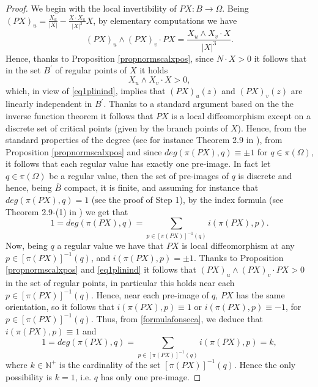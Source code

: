 \documentclass[a4paper,reqno,10pt,oneside]{amsart}
\numberwithin{equation}{section}
\begin{document}
\begin{proof}
We begin with the local invertibility of $PX:B \to \Omega$. Being $(PX)_u= \frac{X_u}{|X|} - \frac{X\cdot X_u}{|X|^3}X$, by elementary computations we have 
\begin{equation}\label{eq1plinind}
(PX)_u\wedge (PX)_v \cdot PX = \frac{X_u \wedge X_v \cdot X}{|X|^3}.
\end{equation}
Hence, thanks to Proposition \ref{propnormscalxpos}, since $N \cdot X >0$ it follows that in the set $B^\prime$ of regular points of $X$ it holds
$$X_u \wedge X_v \cdot X>0, $$
which, in view of \eqref{eq1plinind}, implies that $(PX)_u(z)$ and $(PX)_v(z)$ are linearly independent in $B^\prime$. Thanks to a standard argument based on the the inverse function theorem it follows that $PX$ is a local diffeomorphism except on a discrete set of critical points (given by the branch points of $X$). Hence, from the standard properties of the degree (see for instance Theorem 2.9 in \cite{FonsecaGangbo}), from Proposition \ref{propnormscalxpos} and since $deg(\pi(PX),q)\equiv \pm 1$ for $q \in \pi(\Omega)$, it follows that each regular value has exactly one pre-image. In fact let $q \in \pi(\Omega)$ be a regular value, then the set of pre-images of $q$ is discrete and hence, being $\overline B$ compact, it is finite, and assuming for instance that $deg(\pi(PX),q)=1$ (see the proof of Step 1), by the index formula (see Theorem 2.9-(1) in  \cite{FonsecaGangbo})  we get that 
\begin{equation}\label{formulafonseca}
1=deg(\pi(PX),q)=\sum_{p \in [\pi(PX)]^{-1}(q)} i(\pi(PX),p).
\end{equation}
Now, being $q$ a regular value we have that $PX$ is local diffeomorphism at any $p \in [\pi(PX)]^{-1}(q)$, and $i(\pi(PX),p)=\pm 1$. Thanks to Proposition \ref{propnormscalxpos} and \eqref{eq1plinind} it follows that $(PX)_u\wedge (PX)_v \cdot PX>0$ in the set of regular points, in particular this holds near each $p \in [\pi(PX)]^{-1}(q)$. Hence, near each pre-image of $q$, $PX$ has the same orientation, so it follows that $i(\pi(PX),p)\equiv 1$ or  $i(\pi(PX),p)\equiv -1$, for  $p \in [\pi(PX)]^{-1}(q)$. Thus, from \eqref{formulafonseca}, we deduce that $i(\pi(PX),p)\equiv 1$ and 
$$1=deg(\pi(PX),q)=\sum_{p \in [\pi(PX)]^{-1}(q)} i(\pi(PX),p)=k,$$
where $k \in \mathbb{N}^+$ is the cardinality of the set $[\pi(PX)]^{-1}(q)$. Hence the only possibility is $k=1$, i.e.  $q$ has only one pre-image.
 

\end{proof}
\end{document}
